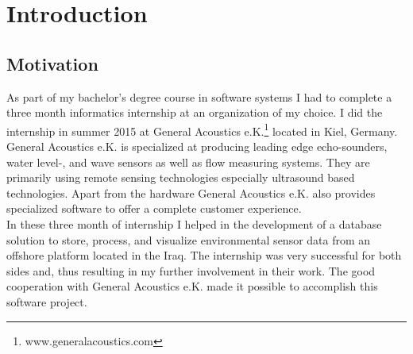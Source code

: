 \chapter{Introduction}

\section{Motivation}
As part of my bachelor's degree course in software systems I had to complete a three month informatics internship at an organization of my choice. I did the internship in summer 2015 at General Acoustics e.K.\footnote{\label{foot:1} www.generalacoustics.com} located in Kiel, Germany. General Acoustics e.K. is specialized at producing leading edge echo-sounders, water level-, and wave sensors as well as flow measuring systems. They are primarily using remote sensing technologies especially ultrasound based technologies. Apart from the hardware General Acoustics e.K. also provides specialized software to offer a complete customer experience.\\
In these three month of internship I helped in the development of a database solution to store, process, and visualize environmental sensor data from an offshore platform located in the Iraq. The internship was very successful for both sides and, thus resulting in my further involvement in their work. The good cooperation with General Acoustics e.K. made it possible to accomplish this software project.%

